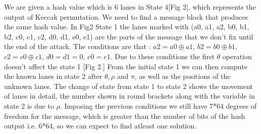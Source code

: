 \documentclass{article}
\begin{document}
\newpar
We are given a hash value which is 6 lanes in State 4[Fig 2], which represents the output of Keccak permutation. We need to find a message block that produces the same hash value. In Fig2 State 1 the lanes marked with (a0, a1, a2, b0, b1, b2, c0, c1, c2, d0, d1, e0, e1) are the parts of the message that we don't fix until the end of the attack.
The conditions are that : $a2 = a0 \oplus a1$,  $b2 = b0 \oplus b1$, $c2 = c0 \oplus c1$, $d0 = d1 = 0$, $e0 = e1$. Due to these conditions the first $\theta$ operation doesn't affect the state 1 [Fig 2.] From the initial state 1 we can then compute the known lanes in state 2 after $\theta, \rho$ and $\pi$, as well as the positions of the unknown lanes.
\newpar
The change of state from state 1 to state 2 shows the movement of lanes in detail, the number shown in round brackets along with the variable in state 2 is due to $\rho$. Imposing the previous conditions we still have 7*64 degrees of freedom for the message, which is greater than the number of bits of the hash output i.e. 6*64, so we can expect to find atleast one solution.\newline
\end{document}
